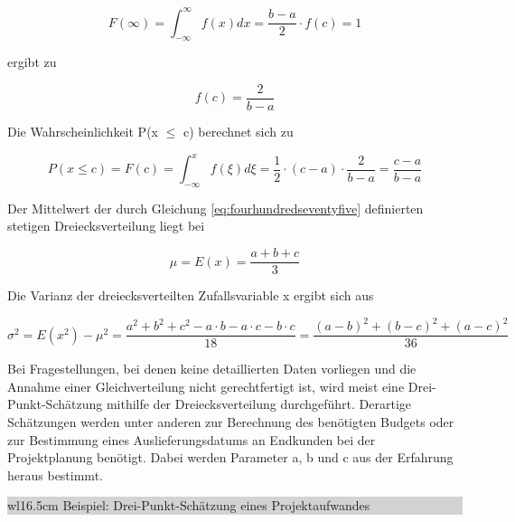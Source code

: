 \begin{equation}\label{eq:fourhundredseventyseven}
F(\infty)=\int _{-\infty}^{\infty}f(x)dx =\dfrac{b-a}{2} \cdot f(c)=1
\end{equation}

\noindent ergibt zu

\begin{equation}\label{eq:fourhundredseventyeight}
f(c)=\dfrac{2}{b-a}
\end{equation}

\noindent Die Wahrscheinlichkeit P(x $\mathrm{\le}$ c) berechnet sich zu

\begin{equation}\label{eq:fourhundredseventynine}
P\left(x\le c\right)=F(c)=\int _{-\infty }^{x}f(\xi )d\xi  =\dfrac{1}{2} \cdot (c-a)\cdot \dfrac{2}{b-a} =\dfrac{c-a}{b-a}
\end{equation}

\noindent Der Mittelwert der durch Gleichung \eqref{eq:fourhundredseventyfive} definierten stetigen Dreiecksverteilung liegt bei

\begin{equation}\label{eq:fourhundredseighty}
\mu =E(x)=\dfrac{a+b+c}{3}
\end{equation}

\noindent Die Varianz der dreiecksverteilten Zufallsvariable x ergibt sich aus

\begin{equation}\label{eq:fourhundredseightyone}
\sigma ^{2} =E\left(x^{2} \right)-\mu ^{2} =\dfrac{a^{2} +b^{2} +c^{2} -a\cdot b-a\cdot c-b\cdot c}{18} =\dfrac{(a-b)^{2} +(b-c)^{2} +(a-c)^{2} }{36}
\end{equation}

\noindent Bei Fragestellungen, bei denen keine detaillierten Daten vorliegen und die Annahme einer Gleichverteilung nicht gerechtfertigt ist, wird meist eine Drei-Punkt-Sch\"{a}tzung mithilfe der Dreiecksverteilung durchgef\"{u}hrt. Derartige Sch\"{a}tzungen werden unter anderen zur Berechnung des ben\"{o}tigten Budgets oder zur Bestimmung eines Auslieferungsdatums an Endkunden bei der Projektplanung ben\"{o}tigt. Dabei werden Parameter a, b und c aus der Erfahrung heraus bestimmt.\bigskip

\noindent
\colorbox{lightgray}{%
%
\renewcommand\arraystretch{0.6}%
\begin{tabular}{ wl{16.5cm} }
{\selectfont
\noindent
Beispiel: Drei-Punkt-Sch\"{a}tzung eines Projektaufwandes}
\end{tabular}%
}\bigskip

